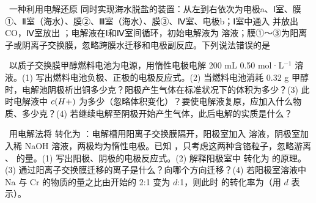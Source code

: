 \begin{xiti}
\item {}\ 一种利用电解还原  同时实现海水脱盐的装置：从左到右依次为电极a、Ⅰ室、膜①、Ⅱ室（海水）、膜②、Ⅲ室（海水）、膜③、Ⅳ室、电极b；Ⅰ室中通入  并放出 CO，Ⅳ室放出 ；电解液在Ⅰ和Ⅳ室间循环，初始电解液为  溶液；膜①～③为阳离子或阴离子交换膜，忽略跨膜水迁移和电极副反应。下列说法错误的是\xz
{}

\item {}\ 以质子交换膜甲醇燃料电池为电源，用惰性电极电解 200 mL 0.50 mol·L$^{-1}$  溶液。(1) 写出燃料电池负极、正极的电极反应式。(2) 当燃料电池消耗 0.32 g 甲醇时，电解池阴极析出铜多少克？阳极产生气体在标准状况下的体积为多少？(3) 此时电解液中 $c(H+)$ 为多少（忽略体积变化）？要使电解液复原，应加入什么物质、多少克？(4) 若继续电解至阴极开始产生气体，此后电解的实质是什么？

\item {}\ 用电解法将  转化为 ：电解槽用阳离子交换膜隔开，阳极室加入  溶液，阴极室加入稀 NaOH 溶液，两极均为惰性电极。已知 ，只考虑这两种含铬粒子，忽略游离 、 的量。(1) 写出阳极、阴极的电极反应式。(2) 解释阳极室中  转化为  的原理。(3) 通过阳离子交换膜迁移的离子是什么？向哪个方向迁移？(4) 若阳极室溶液中 Na 与 Cr 的物质的量之比由开始的 2:1 变为 $d$:1，则此时  的转化率为\tk（用 $d$ 表示）。
\end{xiti}

